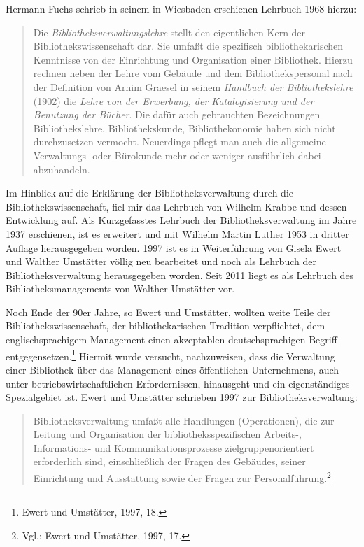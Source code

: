 \documentclass[a4paper,
fontsize=11pt,
oneside,
numbers=noperiodatend,
parskip=half-,
bibliography=totoc,
final
]{scrartcl}
\begin{document}
Hermann Fuchs schrieb in seinem in Wiesbaden erschienen Lehrbuch 1968
hierzu:

\begin{quote}
Die \emph{Bibliotheksverwaltungslehre} stellt den eigentlichen Kern der
Bibliothekswissenschaft dar. Sie umfaßt die spezifisch
bibliothekarischen Kenntnisse von der Einrichtung und Organisation einer
Bibliothek. Hierzu rechnen neben der Lehre vom Gebäude und dem
Bibliothekspersonal nach der Definition von Arnim Graesel in seinem
\emph{Handbuch der Bibliothekslehre} (1902) die \emph{Lehre von der
Erwerbung, der Katalogisierung und der Benutzung der Bücher}. Die dafür
auch gebrauchten Bezeichnungen Bibliothekslehre, Bibliothekskunde,
Bibliothekonomie haben sich nicht durchzusetzen vermocht. Neuerdings
pflegt man auch die allgemeine Verwaltungs- oder Bürokunde mehr oder
weniger ausführlich dabei abzuhandeln.
\end{quote}

Im Hinblick auf die Erklärung der Bibliotheksverwaltung durch die
Bibliothekswissenschaft, fiel mir das Lehrbuch von Wilhelm Krabbe und
dessen Entwicklung auf. Als Kurzgefasstes Lehrbuch der
Bibliotheksverwaltung im Jahre 1937 erschienen, ist es erweitert und mit
Wilhelm Martin Luther 1953 in dritter Auflage herausgegeben worden. 1997
ist es in Weiterführung von Gisela Ewert und Walther Umstätter völlig
neu bearbeitet und noch als Lehrbuch der Bibliotheksverwaltung
herausgegeben worden. Seit 2011 liegt es als Lehrbuch des
Bibliotheksmanagements von Walther Umstätter vor.

Noch Ende der 90er Jahre, so Ewert und Umstätter, wollten weite Teile
der Bibliothekswissenschaft, der bibliothekarischen Tradition
verpflichtet, dem englischsprachigem Management einen akzeptablen
deutschsprachigen Begriff entgegensetzen.\footnote{Ewert und Umstätter,
  1997, 18.} Hiermit wurde versucht, nachzuweisen, dass die Verwaltung
einer Bibliothek über das Management eines öffentlichen Unternehmens,
auch unter betriebswirtschaftlichen Erfordernissen, hinausgeht und ein
eigenständiges Spezialgebiet ist. Ewert und Umstätter schrieben 1997 zur
Bibliotheksverwaltung:

\begin{quote}
Bibliotheksverwaltung umfaßt alle Handlungen (Operationen), die zur
Leitung und Organisation der bibliotheksspezifischen Arbeits-,
Informations- und Kommunikationsprozesse zielgruppenorientiert
erforderlich sind, einschließlich der Fragen des Gebäudes, seiner
Einrichtung und Ausstattung sowie der Fragen zur
Personalführung.\footnote{Vgl.: Ewert und Umstätter, 1997, 17.}
\end{quote}
\end{document}

